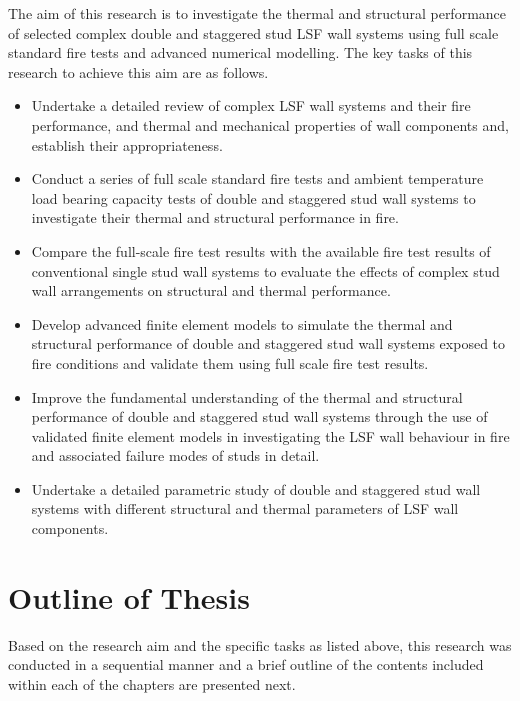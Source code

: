 The aim of this research is to investigate the thermal and structural performance of selected complex double and staggered stud LSF wall systems using full scale standard fire tests and advanced numerical modelling. The key tasks of this research to achieve this aim are as follows. 
\begin{itemize}
	\item Undertake a detailed review of complex LSF wall systems and their fire performance, and thermal and mechanical properties of wall components and, establish their appropriateness.
	\item Conduct a series of full scale standard fire tests and ambient temperature load bearing capacity tests of double and staggered stud wall systems to investigate their thermal and structural performance in fire. 
	\item Compare the full-scale fire test results with the available fire test results of conventional single stud wall systems to evaluate the effects of complex stud wall arrangements on structural and thermal performance.  
	\item Develop advanced finite element models to simulate the thermal and structural performance of double and staggered stud wall systems exposed to fire conditions and validate them using full scale fire test results.
	\item Improve the fundamental understanding of the thermal and structural performance of double and staggered stud wall systems through the use of validated finite element models in investigating the LSF wall behaviour in fire and associated failure modes of studs in detail.
	\item Undertake a detailed parametric study of double and staggered stud wall systems with different structural and thermal parameters of LSF wall components. 
\end{itemize}

\section{Outline of Thesis}

Based on the research aim and the specific tasks as listed above, this research was conducted in a sequential manner and a brief outline of the contents included within each of the chapters are presented next.

